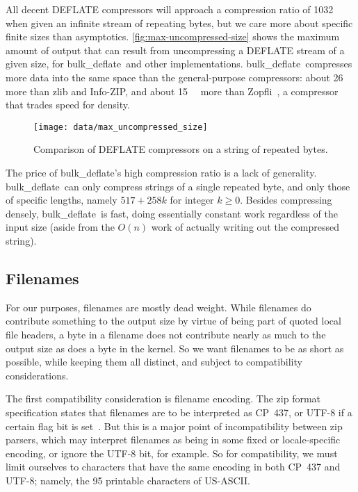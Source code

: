 \documentclass[letterpaper,twocolumn,10pt]{article}
\newcommand{\kB}{\kilo\byte}
\newcommand{\bulkdeflate}{\mbox{bulk\_deflate}}
\begin{document}
All decent DEFLATE compressors will approach a compression ratio of \num{1032}
when given an infinite stream of repeating bytes,
but we care more about specific finite sizes
than asymptotics.
\autoref{fig:max-uncompressed-size} shows the
maximum amount of output
that can result from uncompressing a DEFLATE stream of a given size,
for \bulkdeflate\ and other implementations.
\bulkdeflate\ compresses more data
into the same space than the general-purpose compressors:
about \SI{26}{\kB} more than zlib and Info-ZIP,
and about \SI{15}{\kB} more than Zopfli~\cite{zopfli},
a compressor that trades speed for density.

\begin{figure}
\texttt{[image: data/max\_uncompressed\_size]}
\caption{
Comparison of DEFLATE compressors
on a string of repeated bytes.
}
\label{fig:max-uncompressed-size}
\end{figure}

The price of \bulkdeflate's high compression ratio is a lack of generality.
\bulkdeflate\ can only compress strings of a single repeated byte,
and only those of specific lengths,
namely $517 + 258 k$ for integer $k \ge 0$.
Besides compressing densely, \bulkdeflate\ is fast,
doing essentially constant work regardless of the input size
(aside from the $O(n)$ work of actually writing out the compressed string).

\subsection{Filenames}
\label{sec:filenames}

For our purposes, filenames are mostly dead weight.
While filenames do contribute something to the output size
by virtue of being part of quoted local file headers,
a byte in a filename does not contribute nearly as much to the output size
as does a byte in the kernel.
So we want filenames to be as short as possible,
while keeping them all distinct,
and subject to compatibility considerations.

The first compatibility consideration is filename encoding.
The zip format specification states that filenames
are to be interpreted as CP~437,
or \mbox{UTF-8} if a certain flag bit is set~\cite[Appendix~D]{appnote}.
But this is a major point of incompatibility
between zip parsers,
which may interpret filenames as being in
some fixed or locale-specific encoding, or ignore the \mbox{UTF-8} bit, for example.
So for compatibility, we must limit ourselves to characters
that have the same encoding in both
CP~437 and \mbox{UTF-8};
namely, the \num{95} printable characters of \mbox{US-ASCII}.
\end{document}
